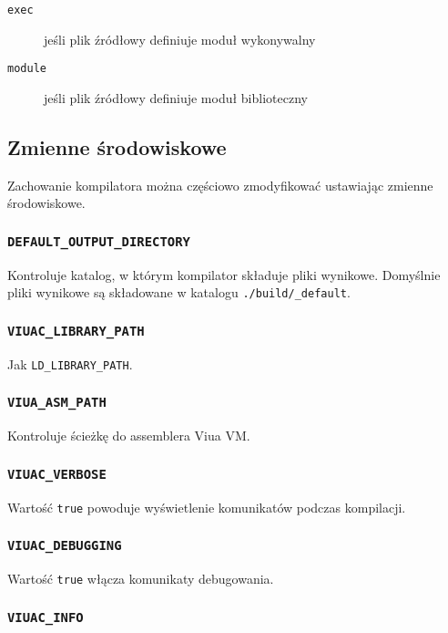 \begin{description}
    \item[\texttt{exec}] jeśli plik źródłowy definiuje moduł wykonywalny
    \item[\texttt{module}] jeśli plik źródłowy definiuje moduł biblioteczny
\end{description}

\subsection{Zmienne środowiskowe}

Zachowanie kompilatora można częściowo zmodyfikować ustawiając zmienne środowiskowe.

\subsubsection{\texttt{DEFAULT\_OUTPUT\_DIRECTORY}}

Kontroluje katalog, w którym kompilator składuje pliki wynikowe. Domyślnie pliki wynikowe są składowane w
katalogu \texttt{./build/\_default}.

\subsubsection{\texttt{VIUAC\_LIBRARY\_PATH}}

Jak \texttt{LD\_LIBRARY\_PATH}.

\subsubsection{\texttt{VIUA\_ASM\_PATH}}

Kontroluje ścieżkę do assemblera Viua VM.

\subsubsection{\texttt{VIUAC\_VERBOSE}}

Wartość \texttt{true} powoduje wyświetlenie komunikatów podczas kompilacji.

\subsubsection{\texttt{VIUAC\_DEBUGGING}}

Wartość \texttt{true} włącza komunikaty debugowania.

\subsubsection{\texttt{VIUAC\_INFO}}

